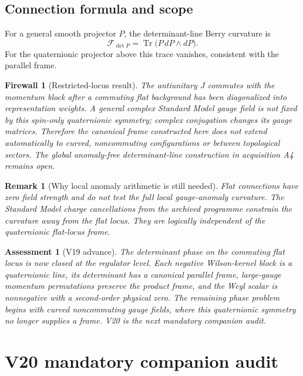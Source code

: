 \documentclass[11pt]{article}
\newtheorem{remark}[theorem]{Remark}
\newtheorem{assessment}[theorem]{Assessment}
\newtheorem{firewall}[theorem]{Firewall}
\newcommand{\Tr}{\operatorname{Tr}}
\begin{document}
\subsection{Connection formula and scope}

For a general smooth projector \(P\), the determinant-line Berry curvature
is
\[
 \mathcal F_{\det P}
 =
 \Tr\bigl(P\,dP\wedge dP\bigr).
 \tag{19.19}
\]
For the quaternionic projector above this trace vanishes, consistent with
the parallel frame.

\begin{firewall}[Restricted-locus result]
\label{fw:v11v19-restricted}
The antiunitary \(J\) commutes with the momentum block after a commuting
flat background has been diagonalized into representation weights.  A
general complex Standard Model gauge field is not fixed by this
spin-only quaternionic symmetry; complex conjugation changes its gauge
matrices.  Therefore the canonical frame constructed here does not
extend automatically to curved, noncommuting configurations or between
topological sectors.  The global anomaly-free determinant-line
construction in acquisition A4 remains open.
\end{firewall}

\begin{remark}[Why local anomaly arithmetic is still needed]
\label{rem:v11v19-anomaly}
Flat connections have zero field strength and do not test the full local
gauge-anomaly curvature.  The Standard Model charge cancellations from
the archived programme constrain the curvature away from the flat locus.
They are logically independent of the quaternionic flat-locus frame.
\end{remark}

\begin{assessment}[V19 advance]
\label{ass:v11v19}
The determinant phase on the commuting flat locus is now closed at the
regulator level.  Each negative Wilson-kernel block is a quaternionic
line, its determinant has a canonical parallel frame, large-gauge
momentum permutations preserve the product frame, and the Weyl scalar is
nonnegative with a second-order physical zero.  The remaining phase
problem begins with curved noncommuting gauge fields, where this
quaternionic symmetry no longer supplies a frame.  V20 is the next
mandatory companion audit.
\end{assessment}


\section{V20 mandatory companion audit}
\label{sec:v11v20}
\end{document}

